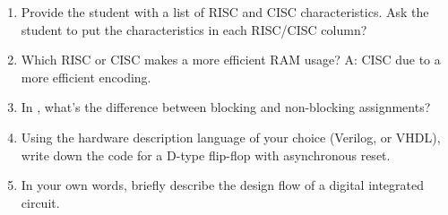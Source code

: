 \documentclass[]{exam}
\newif\ifanswers
\begin{document}
\begin{enumerate}
\item Provide the student with a list of RISC and CISC characteristics. Ask the student to put the characteristics in each RISC/CISC column?

\item Which RISC or CISC makes a more efficient RAM usage? A: CISC due to a more efficient encoding.

\ifanswers\\
\alertred{18/24}
$\ceil{log_{2}(938)} = 10$
\fi

\item In \SV, what's the difference between blocking and non-blocking assignments?
\ifanswers\\
\alertred{0/5}\\
\alertred{Blocking} assignments, \alertred{=}, are used to model \alertred{combinational} logic.
The name `blocking' comes from the idea that one assignment \emph{blocks} the subsequent assignments, \ie, the code is executed \emph{sequentially}.

\alertblue{Non-blocking} assignments, \alertblue{\textless{}=}, are used to model \alertblue{sequential} logic.
The name `non-blocking' comes from the idea that all assignments in a process are evaluated at the same time, \ie, the code is executed in \emph{parallel}.
\fi

\item Using the hardware description language of your choice (Verilog, \SV or VHDL), write down the code for a D-type flip-flop with asynchronous reset.
\ifanswers\\
\alertred{3/7}\\
\lstset{
        basicstyle=\small,
        xleftmargin=.03\textwidth, 
        caption=Asynchronous reset D-type \ac{FF} \SV module., 
        label=listing:DFF_SV
        }

\fi

\item In your own words, briefly describe the design flow of a digital integrated circuit.
\ifanswers
\alertred{1/4}\\
\fi


\end{enumerate}
\end{document}
